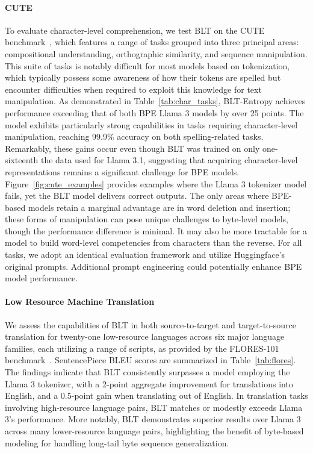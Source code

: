 \paragraph{CUTE}
To evaluate character-level comprehension, we test {\textsc BLT} on the CUTE benchmark~\citep{edman2024cute}, which features a range of tasks grouped into three principal areas: compositional understanding, orthographic similarity, and sequence manipulation. This suite of tasks is notably difficult for most models based on tokenization, which typically possess some awareness of how their tokens are spelled but encounter difficulties when required to exploit this knowledge for text manipulation. As demonstrated in Table~\ref{tab:char_tasks}, {\textsc BLT}-Entropy achieves performance exceeding that of both BPE Llama 3 models by over 25 points. The model exhibits particularly strong capabilities in tasks requiring character-level manipulation, reaching 99.9\% accuracy on both spelling-related tasks. Remarkably, these gains occur even though {\textsc BLT} was trained on only one-sixteenth the data used for Llama 3.1, suggesting that acquiring character-level representations remains a significant challenge for BPE models. Figure~\ref{fig:cute_examples} provides examples where the Llama 3 tokenizer model fails, yet the {\textsc BLT} model delivers correct outputs. The only areas where BPE-based models retain a marginal advantage are in word deletion and insertion; these forms of manipulation can pose unique challenges to byte-level models, though the performance difference is minimal. It may also be more tractable for a model to build word-level competencies from characters than the reverse. For all tasks, we adopt an identical evaluation framework and utilize Huggingface's original prompts. Additional prompt engineering could potentially enhance BPE model performance.

\paragraph{Low Resource Machine Translation} We assess the capabilities of {\textsc BLT} in both source-to-target and target-to-source translation for twenty-one low-resource languages across six major language families, each utilizing a range of scripts, as provided by the FLORES-101 benchmark~\citep{goyal2022flores}. SentencePiece BLEU scores are summarized in Table~\ref{tab:flores}. The findings indicate that {\textsc BLT} consistently surpasses a model employing the Llama 3 tokenizer, with a 2-point aggregate improvement for translations into English, and a 0.5-point gain when translating out of English. In translation tasks involving high-resource language pairs, {\textsc BLT} matches or modestly exceeds Llama 3’s performance. More notably, {\textsc BLT} demonstrates superior results over Llama 3 across many lower-resource language pairs, highlighting the benefit of byte-based modeling for handling long-tail byte sequence generalization.

